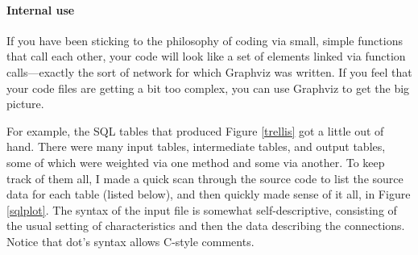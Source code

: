  \addtocounter{ex}{-1} 

 
\paragraph{Internal use}
If you have been sticking to the philosophy of coding via small,
simple functions that call each other, your code will look like a set
of elements linked via function calls---exactly the sort of network for
which Graphviz was written. If you feel that your code files are getting
a bit too complex, you can use Graphviz to get the big picture.

For example, the SQL tables that produced Figure
\ref{trellis} got a little out of hand. There were many input tables,
intermediate tables, and output tables, some of which were weighted
via one method and some via another. To keep track of them all, I made
a quick scan through the source code to list the source data for each
table (listed below), and then  quickly made sense of it all,
in Figure \ref{sqlplot}.  The syntax of the input file is somewhat
self-descriptive, consisting of the usual setting of characteristics
and then the data describing the connections. Notice that dot's syntax
allows C-style comments.

